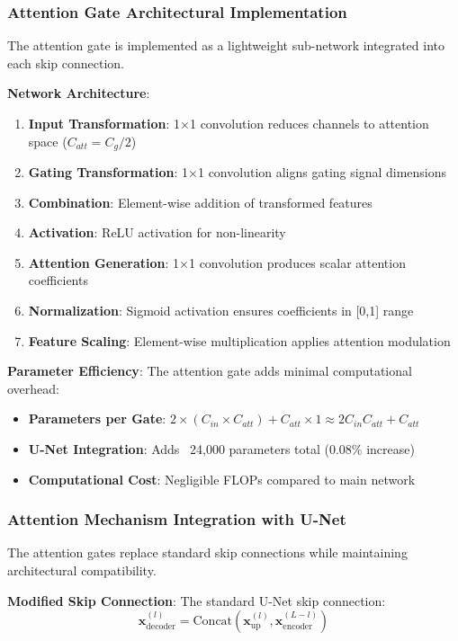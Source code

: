 \documentclass[12pt,a4paper]{article}
\begin{document}
\subsubsection{Attention Gate Architectural Implementation}

The attention gate is implemented as a lightweight sub-network integrated into each skip connection.

\textbf{Network Architecture}:
\begin{enumerate}
    \item \textbf{Input Transformation}: 1×1 convolution reduces channels to attention space ($C_{att} = C_g/2$)
    \item \textbf{Gating Transformation}: 1×1 convolution aligns gating signal dimensions
    \item \textbf{Combination}: Element-wise addition of transformed features
    \item \textbf{Activation}: ReLU activation for non-linearity
    \item \textbf{Attention Generation}: 1×1 convolution produces scalar attention coefficients
    \item \textbf{Normalization}: Sigmoid activation ensures coefficients in [0,1] range
    \item \textbf{Feature Scaling}: Element-wise multiplication applies attention modulation
\end{enumerate}

\textbf{Parameter Efficiency}:
The attention gate adds minimal computational overhead:
\begin{itemize}
    \item \textbf{Parameters per Gate}: $2 \times (C_{in} \times C_{att}) + C_{att} \times 1 \approx 2C_{in}C_{att} + C_{att}$
    \item \textbf{U-Net Integration}: Adds ~24,000 parameters total (0.08\% increase)
    \item \textbf{Computational Cost}: Negligible FLOPs compared to main network
\end{itemize}

\subsubsection{Attention Mechanism Integration with U-Net}

The attention gates replace standard skip connections while maintaining architectural compatibility.

\textbf{Modified Skip Connection}:
The standard U-Net skip connection:
\begin{equation}
\mathbf{x}^{(l)}_{\text{decoder}} = \text{Concat}(\mathbf{x}^{(l)}_{\text{up}}, \mathbf{x}^{(L-l)}_{\text{encoder}})
\end{equation}
\end{document}
